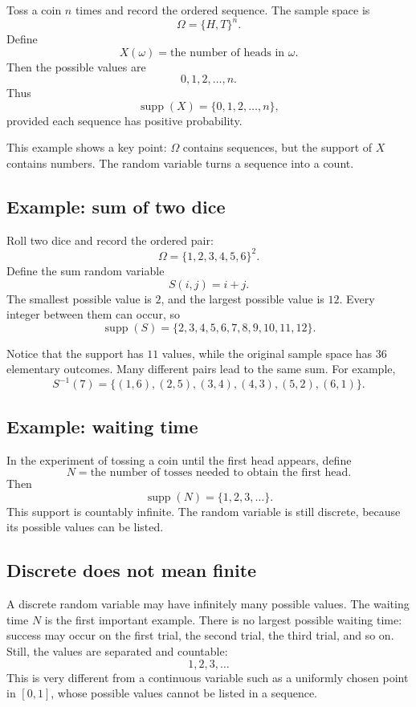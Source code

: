 Toss a coin \(n\) times and record the ordered sequence. The sample space is
\[
\Omega=\{H,T\}^n.
\]
Define
\[
X(\omega)=\text{the number of heads in }\omega.
\]
Then the possible values are
\[
0,1,2,\ldots,n.
\]
Thus
\[
\operatorname{supp}(X)=\{0,1,2,\ldots,n\},
\]
provided each sequence has positive probability.

This example shows a key point: \(\Omega\) contains sequences, but the support of
\(X\) contains numbers. The random variable turns a sequence into a count.

\subsection*{Example: sum of two dice}

Roll two dice and record the ordered pair:
\[
\Omega=\{1,2,3,4,5,6\}^2.
\]
Define the sum random variable
\[
S(i,j)=i+j.
\]
The smallest possible value is \(2\), and the largest possible value is \(12\).
Every integer between them can occur, so
\[
\operatorname{supp}(S)=\{2,3,4,5,6,7,8,9,10,11,12\}.
\]

Notice that the support has \(11\) values, while the original sample space has
\(36\) elementary outcomes. Many different pairs lead to the same sum. For
example,
\[
S^{-1}(7)=\{(1,6),(2,5),(3,4),(4,3),(5,2),(6,1)\}.
\]

\subsection*{Example: waiting time}

In the experiment of tossing a coin until the first head appears, define
\[
N=\text{the number of tosses needed to obtain the first head}.
\]
Then
\[
\operatorname{supp}(N)=\{1,2,3,\ldots\}.
\]
This support is countably infinite. The random variable is still discrete,
because its possible values can be listed.

\subsection*{Discrete does not mean finite}

A discrete random variable may have infinitely many possible values. The waiting
time \(N\) is the first important example. There is no largest possible waiting
time: success may occur on the first trial, the second trial, the third trial,
and so on. Still, the values are separated and countable:
\[
1,2,3,\ldots
\]
This is very different from a continuous variable such as a uniformly chosen
point in \([0,1]\), whose possible values cannot be listed in a sequence.

